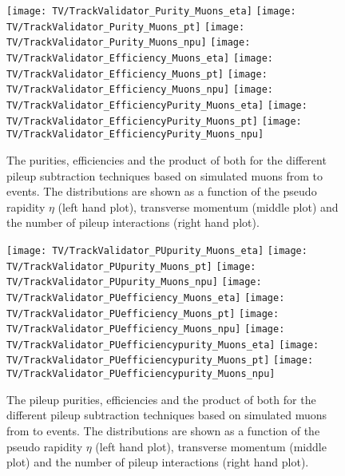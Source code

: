 \begin{figure}[h!t]
  \centering
  \texttt{[image: TV/TrackValidator\_Purity\_Muons\_eta]}
  \texttt{[image: TV/TrackValidator\_Purity\_Muons\_pt]}
  \texttt{[image: TV/TrackValidator\_Purity\_Muons\_npu]}
  \newline
  \texttt{[image: TV/TrackValidator\_Efficiency\_Muons\_eta]}
  \texttt{[image: TV/TrackValidator\_Efficiency\_Muons\_pt]}
  \texttt{[image: TV/TrackValidator\_Efficiency\_Muons\_npu]}
  \newline
  \texttt{[image: TV/TrackValidator\_EfficiencyPurity\_Muons\_eta]}
  \texttt{[image: TV/TrackValidator\_EfficiencyPurity\_Muons\_pt]}
  \texttt{[image: TV/TrackValidator\_EfficiencyPurity\_Muons\_npu]}
  \caption[Purity, efficiency and their product for the different pileup subtraction techniques based on simulated muons from \Zz to \MM events]{The purities, efficiencies and the product of both for the different pileup subtraction techniques based on simulated muons from \Zz to \MM events. The distributions are shown as a function of the pseudo rapidity $\eta$ (left hand plot), transverse momentum (middle plot) and the number of pileup interactions (right hand plot). \label{plot:TACOAMuSignal}}
\end{figure}

\begin{figure}[h!t]
  \centering
  \texttt{[image: TV/TrackValidator\_PUpurity\_Muons\_eta]}
  \texttt{[image: TV/TrackValidator\_PUpurity\_Muons\_pt]}
  \texttt{[image: TV/TrackValidator\_PUpurity\_Muons\_npu]}
  \newline
  \texttt{[image: TV/TrackValidator\_PUefficiency\_Muons\_eta]}
  \texttt{[image: TV/TrackValidator\_PUefficiency\_Muons\_pt]}
  \texttt{[image: TV/TrackValidator\_PUefficiency\_Muons\_npu]}
  \newline
  \texttt{[image: TV/TrackValidator\_PUefficiencypurity\_Muons\_eta]}
  \texttt{[image: TV/TrackValidator\_PUefficiencypurity\_Muons\_pt]}
  \texttt{[image: TV/TrackValidator\_PUefficiencypurity\_Muons\_npu]}
  \caption[Pileup purity, efficiency and their product for the different pileup subtraction techniques based on simulated muons from \Zz to \MM events]{The pileup purities, efficiencies and the product of both for the different pileup subtraction techniques based on simulated muons from \Zz to \MM events. The distributions are shown as a function of the pseudo rapidity $\eta$ (left hand plot), transverse momentum (middle plot) and the number of pileup interactions (right hand plot). \label{plot:TACOAMuPileup}}
\end{figure}

